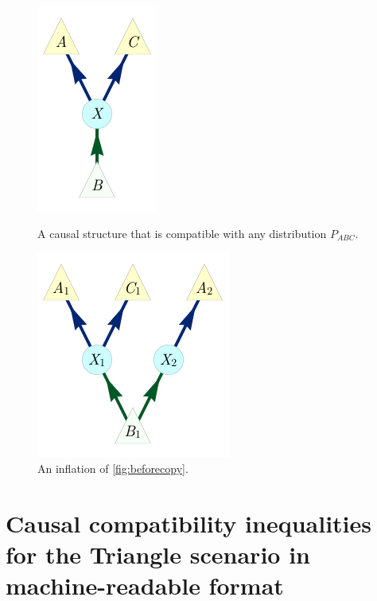 \documentclass[aps,english,superscriptaddress,onecolumn,twoside,longbibliography,pra,floatfix,fleqn,nofootinbib]{revtex4-1}%
\theoremstyle{definition}
\begin{document}
\begin{figure}[H]
\centering
\begin{minipage}[t]{0.4\linewidth}
\centering
\includegraphics[scale=1]{shannonNOcopyV1.pdf}
\caption{A causal structure that is compatible with any distribution $P_{ABC}$.}\label{fig:beforecopy}
\end{minipage}
\hfill
\begin{minipage}[t]{0.4\linewidth}
\centering
\includegraphics[scale=1]{shannonYEScopyV1.pdf}
\caption{An inflation of \cref{fig:beforecopy}.}\label{fig:aftercopy}
\end{minipage}
\end{figure}

\section{Causal compatibility inequalities for the Triangle scenario in machine-readable format}
\label{sec:38ineqs}

\end{document}
